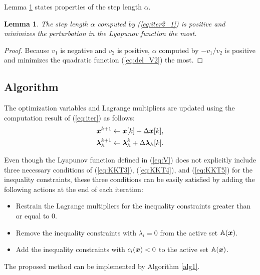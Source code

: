 \documentclass[journal]{IEEEtranTIE}
\newtheorem{lemma}{Lemma}
\begin{document}
Lemma \ref{lem:1} states properties of the step length $\alpha$.%
\begin{lemma}\label{lem:1}
The step length $\alpha$ computed by (\ref{eq:iter2_1}) is positive and minimizes the perturbation in the Lyapunov function the most.
\end{lemma}

\begin{proof}
Because $v_1$ is negative and $v_2$ is positive, $\alpha$ computed by $-v_1/v_2$ is positive and minimizes the quadratic function (\ref{eq:del_V2}) the most.
\end{proof}

\subsection{Algorithm}\label{subsec:algo}

The optimization variables and Lagrange multipliers are updated using the computation result of (\ref{eq:iter}) as follows:
\begin{subequations}
\begin{align}
 \boldsymbol{x}^{k + 1} &\leftarrow \boldsymbol{x}[k] + \Delta\boldsymbol{x}[k],\\
 \boldsymbol{\lambda}_{\mathbb{A}}^{k + 1} &\leftarrow {\boldsymbol{\lambda}_{\mathbb{A}}^{k}} + \Delta\boldsymbol{\lambda}_{\mathbb{A}}[k].
\end{align}
\end{subequations}

Even though the Lyapunov function defined in (\ref{eq:V}) does not explicitly include three necessary conditions of (\ref{eq:KKT3}), (\ref{eq:KKT4}), and (\ref{eq:KKT5}) for the inequality constraints, these three conditions can be easily satisfied by adding the following actions at the end of each iteration: %
\begin{itemize}
    \item Restrain the Lagrange multipliers for the inequality constraints greater than or equal to 0. 
    \item Remove the inequality constraints with $\lambda_i = 0$ from the active set $\mathbb{A}(\boldsymbol{x})$.
    \item Add the inequality constraints with $c_i(\boldsymbol{x}) < 0$ to the active set $\mathbb{A}(\boldsymbol{x})$. %
\end{itemize}

The proposed method can be implemented by Algorithm \ref{alg1}. 
\end{document}
